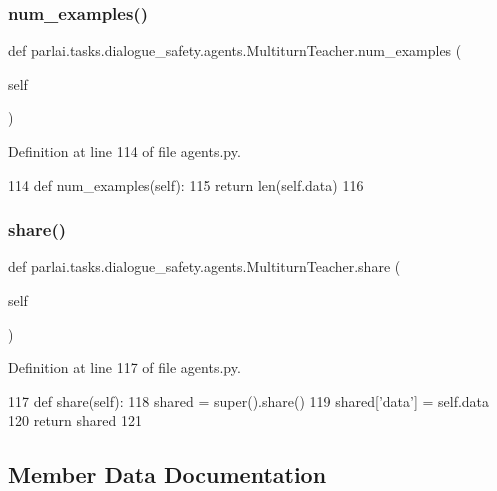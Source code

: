 \subsubsection{\texorpdfstring{num\+\_\+examples()}{num\_examples()}}
{\footnotesize\ttfamily def parlai.\+tasks.\+dialogue\+\_\+safety.\+agents.\+Multiturn\+Teacher.\+num\+\_\+examples (\begin{DoxyParamCaption}\item[{}]{self }\end{DoxyParamCaption})}



Definition at line 114 of file agents.\+py.


\begin{DoxyCode}
114     \textcolor{keyword}{def }num\_examples(self):
115         \textcolor{keywordflow}{return} len(self.data)
116 
\end{DoxyCode}
\mbox{\label{classparlai_1_1tasks_1_1dialogue__safety_1_1agents_1_1MultiturnTeacher_a87ea872108b71104aaffb2430bfae3df}} 
\subsubsection{\texorpdfstring{share()}{share()}}
{\footnotesize\ttfamily def parlai.\+tasks.\+dialogue\+\_\+safety.\+agents.\+Multiturn\+Teacher.\+share (\begin{DoxyParamCaption}\item[{}]{self }\end{DoxyParamCaption})}



Definition at line 117 of file agents.\+py.


\begin{DoxyCode}
117     \textcolor{keyword}{def }share(self):
118         shared = super().share()
119         shared[\textcolor{stringliteral}{'data'}] = self.data
120         \textcolor{keywordflow}{return} shared
121 
\end{DoxyCode}


\subsection{Member Data Documentation}
\mbox{\label{classparlai_1_1tasks_1_1dialogue__safety_1_1agents_1_1MultiturnTeacher_a6a2355fab338fcf40b7eb1b183caa526}} 
